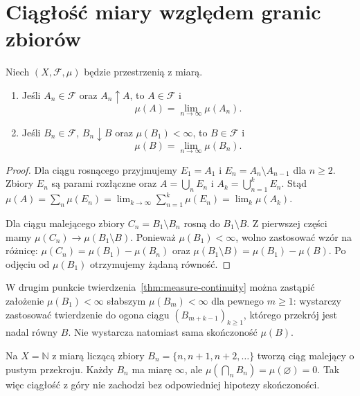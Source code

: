 \section{Ciągłość miary względem granic zbiorów}

\begin{twierdzenie}
\label{thm:measure-continuity}
Niech $(X,\mathcal F,\mu)$ będzie przestrzenią z miarą.
\begin{enumerate}
\item Jeśli $A_n\in\mathcal F$ oraz $A_n\uparrow A$, to
$A\in\mathcal F$ i
\begin{equation}
\label{eq:continuity-below}
\mu(A)=\lim_{n\to\infty}\mu(A_n).
\end{equation}
\item Jeśli $B_n\in\mathcal F$, $B_n\downarrow B$ oraz
$\mu(B_1)<\infty$, to $B\in\mathcal F$ i
\begin{equation}
\label{eq:continuity-above}
\mu(B)=\lim_{n\to\infty}\mu(B_n).
\end{equation}
\end{enumerate}
\end{twierdzenie}
\begin{proof}
Dla ciągu rosnącego przyjmujemy $E_1=A_1$ i
$E_n=A_n\setminus A_{n-1}$ dla $n\geq2$.
Zbiory $E_n$ są parami rozłączne oraz
$A=\bigcup_nE_n$ i $A_k=\bigcup_{n=1}^kE_n$.
Stąd
$\mu(A)=\sum_n\mu(E_n)=\lim_{k\to\infty}\sum_{n=1}^k\mu(E_n)
=\lim_k\mu(A_k)$.

Dla ciągu malejącego zbiory $C_n=B_1\setminus B_n$ rosną
do $B_1\setminus B$. Z pierwszej części mamy
$\mu(C_n)\to\mu(B_1\setminus B)$. Ponieważ
$\mu(B_1)<\infty$, wolno zastosować wzór na różnicę:
$\mu(C_n)=\mu(B_1)-\mu(B_n)$ oraz
$\mu(B_1\setminus B)=\mu(B_1)-\mu(B)$.
Po odjęciu od $\mu(B_1)$ otrzymujemy żądaną równość.
\end{proof}

\begin{uwaga}
W drugim punkcie twierdzenia~\ref{thm:measure-continuity} można
zastąpić założenie $\mu(B_1)<\infty$ słabszym
$\mu(B_m)<\infty$ dla pewnego $m\ge1$: wystarczy
zastosować twierdzenie do ogona ciągu
$(B_{m+k-1})_{k\ge1}$, którego przekrój jest nadal równy $B$.
Nie wystarcza natomiast sama skończoność $\mu(B)$.
\end{uwaga}

\begin{przyklad}
\label{ex:continuity-counterexample}
Na $X=\mathbb N$ z miarą liczącą zbiory
$B_n=\{n,n+1,n+2,\ldots\}$ tworzą ciąg malejący o pustym
przekroju. Każdy $B_n$ ma miarę $\infty$, ale
$\mu(\bigcap_nB_n)=\mu(\varnothing)=0$.
Tak więc ciągłość z góry nie zachodzi bez odpowiedniej
hipotezy skończoności.
\end{przyklad}

